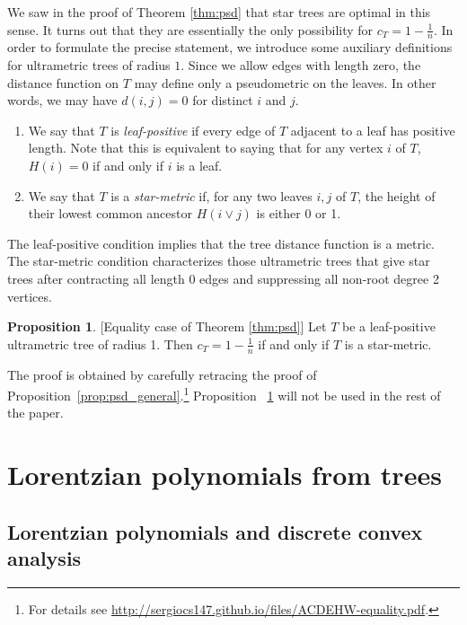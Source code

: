 \documentclass{amsart}
\theoremstyle{definition}
\newtheorem{proposition}[theorem]{Proposition}
\theoremstyle{remark}
\newcommand{\1}{\mathbf{1}}
\numberwithin{equation}{section}
\begin{document}
We saw in the proof of Theorem \ref{thm:psd} that star trees are optimal in this sense. 
It turns out that
they are essentially the only possibility for $c_T = 1-\frac1n$.   In order to
formulate the precise statement, we introduce some auxiliary definitions for ultrametric trees of radius $1$. Since we allow edges with length zero,
the distance function on $T$ may define only a
pseudometric on the leaves. In other words, we may have $d(i,j)=0$ for distinct $i$ and $j$.
\begin{enumerate}[(1)]\itemsep 5pt
    \item We say that $T$ is \textit{leaf-positive} if every edge of $T$ adjacent to a leaf has positive length. Note that this is equivalent to saying that for any vertex $i$ of $T$, $H(i)=0$ if and only if $i$ is a leaf. 
    \item We say that $T$ is a \textit{star-metric} if, for any two leaves $i,j$ of $T$, the height of their lowest common ancestor $H(i\vee j)$ is either 0 or 1. 
\end{enumerate}
The leaf-positive condition implies that the tree distance function is a metric.
The star-metric condition characterizes those ultrametric trees
that give star trees after contracting all length 0 edges and suppressing all non-root degree 2 vertices. 

\begin{proposition}\label{prop:equality_psd}[Equality case of Theorem \ref{thm:psd}] 
	Let $T$ be a leaf-positive ultrametric tree of radius 1.  Then $c_T=1-\frac1n$ if and only if $T$ is a star-metric. 
\end{proposition}

The proof is obtained by carefully retracing the proof of Proposition~\ref{prop:psd_general}.\footnote{For details see  \url{http://sergiocs147.github.io/files/ACDEHW-equality.pdf}.} 
Proposition ~\ref{prop:equality_psd}
will not be used in  the rest of the paper.

 

\section{Lorentzian polynomials from trees}


\subsection{Lorentzian polynomials and discrete convex analysis}\label{SectionLorentzian}
\end{document}
